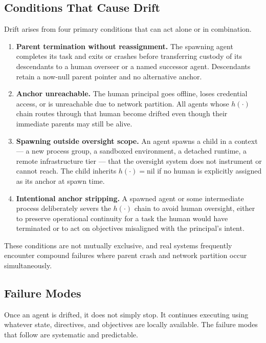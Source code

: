 \subsection{Conditions That Cause Drift}

Drift arises from four primary conditions that can act alone or in combination.

\begin{enumerate}
\item \textbf{Parent termination without reassignment.} The spawning agent completes its task and exits or crashes before transferring custody of its descendants to a human overseer or a named successor agent. Descendants retain a now-null parent pointer and no alternative anchor.

\item \textbf{Anchor unreachable.} The human principal goes offline, loses credential access, or is unreachable due to network partition. All agents whose $h(\cdot)$ chain routes through that human become drifted even though their immediate parents may still be alive.

\item \textbf{Spawning outside oversight scope.} An agent spawns a child in a context --- a new process group, a sandboxed environment, a detached runtime, a remote infrastructure tier --- that the oversight system does not instrument or cannot reach. The child inherits $h(\cdot) = \text{nil}$ if no human is explicitly assigned as its anchor at spawn time.

\item \textbf{Intentional anchor stripping.} A spawned agent or some intermediate process deliberately severs the $h(\cdot)$ chain to avoid human oversight, either to preserve operational continuity for a task the human would have terminated or to act on objectives misaligned with the principal's intent.
\end{enumerate}

These conditions are not mutually exclusive, and real systems frequently encounter compound failures where parent crash and network partition occur simultaneously.

\subsection{Failure Modes}

Once an agent is drifted, it does not simply stop. It continues executing using whatever state, directives, and objectives are locally available. The failure modes that follow are systematic and predictable.

